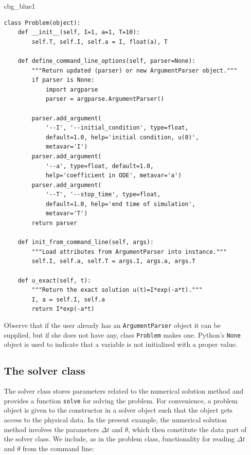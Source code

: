 \documentclass[%
oneside,                 %
final,                   %
10pt]{article}
\newenvironment{_cod_tight}[1]{
   \def\FrameCommand{\colorbox{#1}}
   \FrameRule0.6pt\MakeFramed {\FrameRestore}\vskip3mm}
   {\vskip0mm\endMakeFramed}
\newenvironment{cod}[1]{
\bgroup\rmfamily
\fboxsep=0mm\relax
\begin{_cod_tight}{#1}
\list{}{\parsep=-2mm\parskip=0mm\topsep=0pt\leftmargin=2mm
\rightmargin=2\leftmargin\leftmargin=4pt\relax}
\item\relax}
{\endlist\end{_cod_tight}\egroup}
\begin{document}
\begin{cod}{cbg_blue1}\begin{Verbatim}[numbers=none,fontsize=\fontsize{9pt}{9pt},baselinestretch=0.95,xleftmargin=2mm]
class Problem(object):
    def __init__(self, I=1, a=1, T=10):
        self.T, self.I, self.a = I, float(a), T

    def define_command_line_options(self, parser=None):
        """Return updated (parser) or new ArgumentParser object."""
        if parser is None:
            import argparse
            parser = argparse.ArgumentParser()

        parser.add_argument(
            '--I', '--initial_condition', type=float,
            default=1.0, help='initial condition, u(0)',
            metavar='I')
        parser.add_argument(
            '--a', type=float, default=1.0,
            help='coefficient in ODE', metavar='a')
        parser.add_argument(
            '--T', '--stop_time', type=float,
            default=1.0, help='end time of simulation',
            metavar='T')
        return parser

    def init_from_command_line(self, args):
        """Load attributes from ArgumentParser into instance."""
        self.I, self.a, self.T = args.I, args.a, args.T

    def u_exact(self, t):
        """Return the exact solution u(t)=I*exp(-a*t)."""
        I, a = self.I, self.a
        return I*exp(-a*t)
\end{Verbatim}
\end{cod}
\noindent
Observe that if the user already has an \texttt{ArgumentParser} object it can be
supplied, but if she does not have any, class \texttt{Problem} makes one.
Python's \texttt{None} object is used to indicate that a variable is not
initialized with a proper value.

\subsection{The solver class}


The solver class stores parameters related to the numerical solution method
and provides a function \texttt{solve} for solving the problem.
For convenience, a problem object is given to the constructor
in a solver object such that the object gets access to the
physical data. In the present example,
the numerical solution method involves the parameters $\Delta t$
and $\theta$, which then constitute the data part of the solver class.
We include, as in the problem class, functionality for
reading $\Delta t$ and $\theta$ from the command line:
\end{document}
